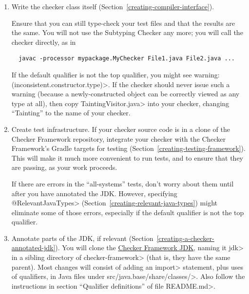 \begin{enumerate}
  Type-check your test files using the Subtyping Checker
  (), using a command like

\begin{small}
\begin{Verbatim}
javacheck \
  -processor org.checkerframework.common.subtyping.SubtypingChecker \
  -Aquals=org.checkerframework.checker.mycheckername.qual.MyTopQual,org.checkerframework.checker.mycheckername.qual.MyBottomQual \
  TestHierarchy.java
\end{Verbatim}
\end{small}


\item
\label{creating-tips-implement-checker}
  Write the checker class itself
  (Section~\ref{creating-compiler-interface}).

  Ensure that you can still type-check your test files and that the results
  are the same.  You will not use the Subtyping Checker any more; you will
  call the checker directly, as in

\begin{Verbatim}
  javac -processor mypackage.MyChecker File1.java File2.java ...
\end{Verbatim}

  If the default qualifier is not the top qualifier, you might see \<warning:
  (inconsistent.constructor.type)>.  If the checker should never issue such
  a warning (because a newly-constructed object can be correctly viewed as
  any type at all), then copy \<TaintingVisitor.java> into your checker,
  changing ``Tainting'' to the name of your checker.

\item
\label{creating-tips-test-infrastructure}
  Create test infrastructure.
  If your checker source code is in a clone of the Checker Framework
  repository, integrate your checker with the Checker Framework's Gradle
  targets for testing (Section~\ref{creating-testing-framework}).  This
  will make it much more convenient to run tests, and to ensure that they
  are passing, as your work proceeds.

  If there are errors in the ``all-systems'' tests, don't worry about them
  until after you have annotated the JDK\@.  However, specifying
  \<@RelevantJavaTypes> (Section~\ref{creating-relevant-java-types}) might
  eliminate some of those errors, especially if the default qualifier is
  not the top qualifier.

\item
  Annotate parts of the JDK, if relevant
  (Section~\ref{creating-a-checker-annotated-jdk}).
  You will clone the \href{https://github.com/typetools/jdk}{Checker
  Framework JDK}, naming it \<jdk> in a sibling directory of
  \<checker-framework> (that is, they have the same parent).
  Most changes will consist of adding an \<import> statement, plus uses of
  qualifiers, in Java files under \<src/java.base/share/classes/>.
  Also follow the instructions in section ``Qualifier definitions'' of file
  \<README.md>.


\end{enumerate}
